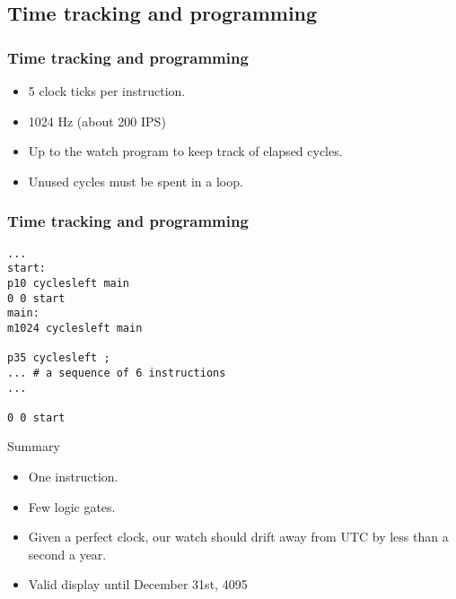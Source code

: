 \documentclass{beamer}
\begin{document}
\subsection{Time tracking and programming}
\begin{frame}
  \frametitle{Time tracking and programming}
  \begin{itemize}
    \item 5 clock ticks per instruction.
    \item 1024 Hz (about 200 IPS)
    \item<2-> Up to the watch program to keep track of elapsed cycles.
    \item<3-> Unused cycles must be spent in a loop.
  \end{itemize}
\end{frame}

\begin{frame}[fragile]
  \frametitle{Time tracking and programming}
    \begin{verbatim}
...
start:
p10 cyclesleft main
0 0 start
main:
m1024 cyclesleft main

p35 cyclesleft ;
... # a sequence of 6 instructions
...

0 0 start
    \end{verbatim}
\end{frame}

\begin{frame}{Summary}
  \begin{itemize}
    \item<2-> One instruction.
    \item<3-> Few logic gates. %
    \item<4-> Given a perfect clock, our watch should drift away from UTC
      by less than a second a year. %
    \item<5-> Valid display until December 31st, 4095
  \end{itemize}
\end{frame}
\end{document}
